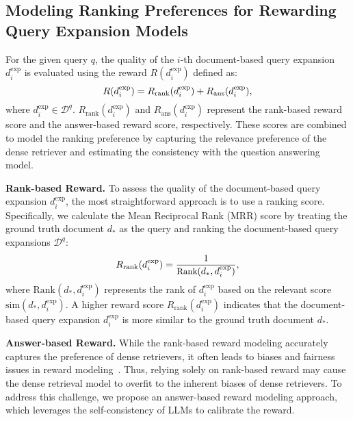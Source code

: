 \subsection{Modeling Ranking Preferences for Rewarding Query Expansion Models}\label{model:reward-model}
For the given query $q$, the quality of the $i$-th document-based query expansion $d^{\text{exp}}_i$ is evaluated using the reward $R(d^{\text{exp}}_i)$ defined as:
\begin{equation}
\small
R(d^{\text{exp}}_i) = R_{\text{rank}}(d^{\text{exp}}_i) + R_{\text{ans}}(d^{\text{exp}}_i),
\end{equation}
where $d^{\text{exp}}_i \in \mathcal{D}^q$. $R_{\text{rank}}( d^{\text{exp}}_i)$ and $R_{\text{ans}}(d^{\text{exp}}_i)$ represent the rank-based reward score and the answer-based reward score, respectively. These scores are combined to model the ranking preference by capturing the relevance preference of the dense retriever and estimating the consistency with the question answering model.



\textbf{Rank-based Reward.} To assess the quality of the document-based query expansion $d^\text{exp}_i$, the most straightforward approach is to use a ranking score. Specifically, we calculate the Mean Reciprocal Rank (MRR) score by treating the ground truth document $d_*$ as the query and ranking the document-based query expansions $\mathcal{D}^q$:
\begin{equation}
\small
R_{\text{rank}}(d^{\text{exp}}_i) = \frac{1}{\text{Rank}(d_*, d^{\text{exp}}_i)},
\end{equation}
where $\text{Rank}(d_*, d^{\text{exp}}_i)$ represents the rank of $d^{\text{exp}}_i$ based on the relevant score $\text{sim}(d_*, d^{\text{exp}}_i)$. A higher reward score $R_{\text{rank}}(d^{\text{exp}}_i)$ indicates that the document-based query expansion $d^{\text{exp}}_i$ is more similar to the ground truth document $d_*$. 


\textbf{Answer-based Reward.} While the rank-based reward modeling accurately captures the preference of dense retrievers, it often leads to biases and fairness issues in reward modeling~\cite{dai2024bias}. Thus, relying solely on rank-based reward may cause the dense retrieval model to overfit to the inherent biases of dense retrievers. To address this challenge, we propose an answer-based reward modeling approach, which leverages the self-consistency of LLMs to calibrate the reward.

